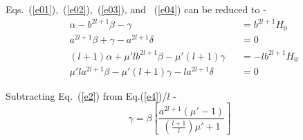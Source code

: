 



Eqs.~(\ref{e01}),~(\ref{e02}),~(\ref{e03}), and ~(\ref{e04}) can be reduced to -
\begin{align}
    &\alpha- b^{2l+1}\beta-\gamma & &=b^{2l+1}H_0\label{e1}\\
    &a^{2l+1}\beta+\gamma-a^{2l+1}\delta &&=0\label{e2}\\
    &(l+1)\alpha+\mu' l b^{2l+1}\beta-\mu'(l+1)\gamma &&=-lb^{2l+1}H_0\label{e3}\\
    &\mu'l a^{2l+1}\beta -\mu'(l+1)\gamma- l a^{2l+1}\delta &&=0\label{e4}
\end{align}

Subtracting Eq.~(\ref{e2}) from Eq.(\ref{e4})/$l$ -
\begin{equation}\label{g1}
\gamma=\beta \left[\frac{a^{2l+1}(\mu'-1)}{\left(\frac{l+1}{l}\right)\mu'+1}\right]
\end{equation}

